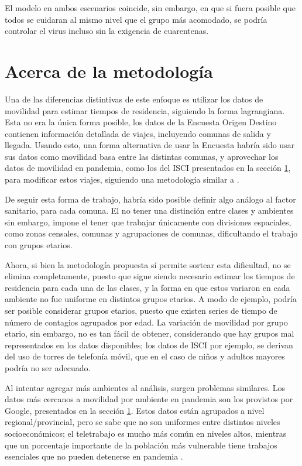 El modelo en ambos escenarios coincide, sin embargo, en que si fuera posible que todos se cuidaran al mismo nivel que el grupo más acomodado, se podría controlar el virus incluso sin la exigencia de cuarentenas.

\section{Acerca de la metodología}

  



Una de las diferencias distintivas de este enfoque es utilizar los datos de movilidad para estimar tiempos de residencia, siguiendo la forma lagrangiana. Esta no era la única forma posible, los datos de la Encuesta Origen Destino contienen información detallada de viajes, incluyendo comunas de salida y llegada. Usando esto, una forma alternativa de usar la Encuesta habría sido usar sus datos como movilidad basa entre las distintas comunas, y aprovechar los datos de movilidad en pandemia, como los del ISCI presentados en la sección \ref{}, para modificar estos viajes, siguiendo una metodología similar a \cite{Lai2020}.


De seguir esta forma de trabajo, habría sido posible definir algo análogo al factor sanitario, para cada comuna. El no tener una distinción entre clases y ambientes sin embargo, impone el tener que trabajar únicamente con divisiones espaciales, como zonas censales, comunas y agrupaciones de comunas, dificultando el trabajo con grupos etarios.

Ahora, si bien la metodología propuesta sí permite sortear esta dificultad, no se elimina completamente, puesto que sigue siendo necesario estimar los tiempos de residencia para cada una de las clases, y la forma en que estos variaron en cada ambiente no fue uniforme en distintos grupos etarios. A modo de ejemplo, podría ser posible considerar grupos etarios, puesto que existen series de tiempo de número de contagios agrupados por edad. La variación de movilidad por grupo etario, sin embargo, no es tan fácil de obtener, considerando que hay grupos mal representados en los datos disponibles; los datos de ISCI por ejemplo, se derivan del uso de torres de telefonía móvil, que en el caso de niños y adultos mayores podría no ser adecuado.

Al intentar agregar más ambientes al análisis, surgen problemas similares. Los datos más cercanos a movilidad por ambiente en pandemia son los provistos por Google, presentados en la sección \ref{}. Estos datos están agrupados a nivel regional/provincial, pero se sabe \cite{Olivares2020} que no son uniformes entre distintos niveles socioeconómicos; el teletrabajo es mucho más común en niveles altos, mientras que un porcentaje importante de la población más vulnerable tiene trabajos esenciales que no pueden detenerse en pandemia \cite{}.


